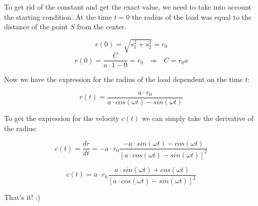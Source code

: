 \documentclass[11pt]{article}
\begin{document}
To get rid of the constant and get the exact value, we need to take into account the starting condition. At the time $t=0$ the radius of the load was equal to the distance of the point $S$ from the center.

\[ r(0) = \sqrt{s_1^2 + s_2^2} = r_0 \]
\[ r(0) = \frac{C}{a\cdot 1 - 0} = r_0 \ \ \ \Rightarrow \ \ \ C = r_0a \]

Now we have the expression for the radius of the load dependent on the time $t$:

\[ r(t) = \frac{a\cdot r_0}{a\cdot cos(\omega t) - sin(\omega t)}\]

To get the expression for the velocity $c(t)$ we can simply take the derivative of the radius:

\[ c(t) = \frac{dr}{dt} = -a\cdot r_0 \frac{-a\cdot sin(\omega t) - cos(\omega t)}{[a\cdot cos(\omega t) - sin(\omega t)]^2}\]

\[ c(t) = a\cdot r_0 \frac{a\cdot sin(\omega t) + cos(\omega t)}{[a\cdot cos(\omega t) - sin(\omega t)]^2} \]

That's it! :)
\end{document}

